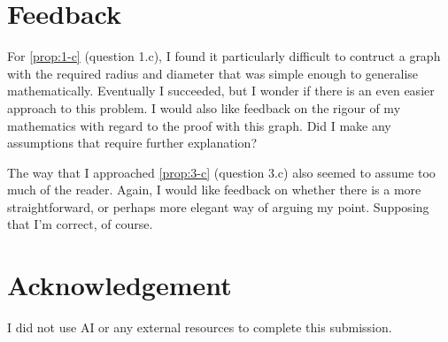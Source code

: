 \pagebreak

\section*{Feedback}

For \cref{prop:1-c} (question 1.c), I found it particularly difficult to contruct a graph with the required radius and diameter that was simple enough to generalise mathematically. Eventually I succeeded, but I wonder if there is an even easier approach to this problem. I would also like feedback on the rigour of my mathematics with regard to the proof with this graph. Did I make any assumptions that require further explanation?

The way that I approached \cref{prop:3-c} (question 3.c) also seemed to assume too much of the reader. Again, I would like feedback on whether there is a more straightforward, or perhaps more elegant way of arguing my point. Supposing that I'm correct, of course.

\pagebreak

\section*{Acknowledgement}

I did not use AI or any external resources to complete this submission.
